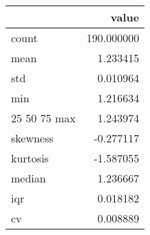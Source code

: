 \begin{tabular}{lr}
\toprule
 & value \\
\midrule
count & 190.000000 \\
mean & 1.233415 \\
std & 0.010964 \\
min & 1.216634 \\
25%
50%
75%
max & 1.243974 \\
skewness & -0.277117 \\
kurtosis & -1.587055 \\
median & 1.236667 \\
iqr & 0.018182 \\
cv & 0.008889 \\
\bottomrule
\end{tabular}
